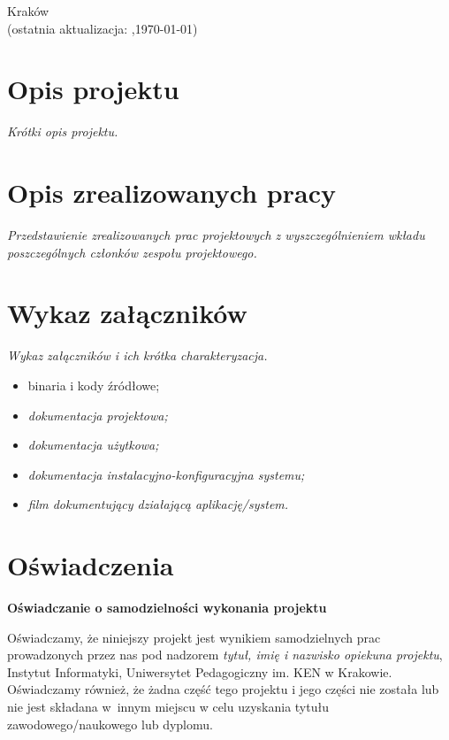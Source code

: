 \documentclass[12pt,a4paper,oneside]{article}
\theoremstyle{definition}
\numberwithin{equation}{section}
\begin{document}
\begin{titlepage}
\vspace*{\fill}
\begin{center}
\large
Kraków \the\year\\
(ostatnia aktualizacja: \DTMcurrenttime,\;\today)
\end{center}
\end{titlepage}
\setcounter{page}{0} 
\newpage\null\thispagestyle{empty}

\tableofcontents


\newpage

\section{Opis projektu}
\textit{Krótki opis projektu.}

\section{Opis zrealizowanych pracy}
\textit{Przedstawienie zrealizowanych prac projektowych z wyszczególnieniem wkładu poszczególnych członków zespołu projektowego.}
\section{Wykaz załączników}
\textit{Wykaz załączników i ich krótka charakteryzacja.}

\begin{itemize}
\item {binaria i kody źródłowe;}
\item \textit{dokumentacja projektowa;}
\item \textit{dokumentacja użytkowa;}
\item \textit{dokumentacja instalacyjno-konfiguracyjna systemu;}
\item \textit{film dokumentujący działającą aplikację/system.}
\end{itemize}

\section{Oświadczenia}
\begin{center}
\textbf{Oświadczanie o samodzielności wykonania projektu}
\end{center}

Oświadczamy, że niniejszy projekt jest wynikiem samodzielnych prac prowadzonych przez nas pod nadzorem \textit{tytuł, imię i nazwisko opiekuna projektu}, Instytut Informatyki, Uniwersytet Pedagogiczny im. KEN w Krakowie. Oświadczamy również, że żadna część tego projektu i jego części nie została lub nie jest składana w~innym miejscu w celu uzyskania tytułu zawodowego/naukowego lub dyplomu.
\end{document}
